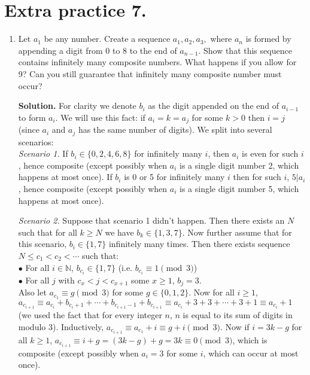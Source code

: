 \documentclass[11pt]{article}
\begin{document}
\section {Extra practice 7.}
\begin{enumerate}
\item Let $a_1$ be any number. Create a sequence $a_1, a_2, a_3,$ where $a_n$ is formed by appending a digit from 0 to 8 to the end of $a_{n-1}$. Show that this sequence contains infinitely many composite numbers. What happens if you allow for 9? Can you still guarantee that infinitely many composite number must occur?

\textbf{Solution.} For clarity we denote $b_i$ as the digit appended on the end of $a_{i-1}$ to form $a_i$. We will use this fact: if $a_i=k=a_j$ for some $k>0$ then $i=j$ (since $a_i$ and $a_j$ has the same number of digits). We split into several scenarios:\\
\emph{Scenario 1.} If $b_i\in\{0,2,4,6,8\}$ for infinitely many $i$, then $a_i$ is even for such $i$, hence composite (except possibly when $a_i$ is a single digit number 2, which happens at most once). If $b_i$ is 0 or 5 for infinitely many $i$ then for such $i$, $5|a_i$, hence composite (except possibly when $a_i$ is a single digit number 5, which happens at most once).

\emph {Scenario 2.} Suppose that scenario 1 didn't happen. Then there exists an $N$ such that for all $k\ge N$ we have $b_k\in\{1,3,7\}$. Now further assume that for this scenario, $b_i\in\{1,7\}$ infinitely many times. Then there exists sequence $N\le c_1<c_2<\cdots$ such that:\\
$\bullet$ For all $i\in\mathbb{N}$, $b_{c_i}\in\{1,7\}$ (i.e. $b_{c_i}\equiv 1\pmod {3}$)\\
$\bullet$ For all $j$ with $c_x<j<c_{x+1}$ some $x\ge 1$, $b_j=3$.\\
Also let $a_{c_1}\equiv g\pmod {3}$ for some $g\in\{0,1,2\}$. Now for all $i\ge 1$, $a_{c_{i+1}}\equiv a_{c_{i}}+b_{c_{i}+1}+\cdots + b_{c_{i+1}-1} + b_{c_{i+1}}\equiv a_{c_i}+3+3+\cdots +3+1\equiv a_{c_i}+1$ (we used the fact that for every integer $n$, $n$ is equal to its sum of digits in modulo 3). Inductively, $a_{c_{i+1}}\equiv a_{c_1}+i\equiv g+i\pmod {3}.$ Now if $i=3k-g$ for all $k\ge 1$, $a_{c_{i+1}}\equiv i+g=(3k-g)+g=3k\equiv 0\pmod{3}$, which is composite (except possibly when $a_i=3$ for some $i$, which can occur at most once).


\end{enumerate}
\end{document}
